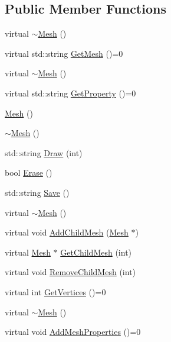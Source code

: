 \subsection*{Public Member Functions}
\begin{DoxyCompactItemize}
\item 
virtual \mbox{\hyperlink{class_mesh_a5efe4da1a4c0971cfb037bd70304c303}{$\sim$\+Mesh}} ()
\item 
virtual std\+::string \mbox{\hyperlink{class_mesh_ac9a0bc76a4e34c3985cbc4c20692c7df}{Get\+Mesh}} ()=0
\item 
virtual \mbox{\hyperlink{class_mesh_ad6a041191ed55c693254e945ce2869ff}{$\sim$\+Mesh}} ()
\item 
virtual std\+::string \mbox{\hyperlink{class_mesh_a94464260c2d9ad3c274f72b472fc9a2f}{Get\+Property}} ()=0
\item 
\mbox{\hyperlink{class_mesh_a2af137f1571af89172b9c102302c416b}{Mesh}} ()
\item 
\mbox{\hyperlink{class_mesh_a5efe4da1a4c0971cfb037bd70304c303}{$\sim$\+Mesh}} ()
\item 
std\+::string \mbox{\hyperlink{class_mesh_a4c2c032325385def999caf43e2ef88fd}{Draw}} (int)
\item 
bool \mbox{\hyperlink{class_mesh_a865729c3f6d111f09a7c422f102038ae}{Erase}} ()
\item 
std\+::string \mbox{\hyperlink{class_mesh_a2d249389fd92b8f6a2d66ac0ab644d6c}{Save}} ()
\item 
virtual \mbox{\hyperlink{class_mesh_ad6a041191ed55c693254e945ce2869ff}{$\sim$\+Mesh}} ()
\item 
virtual void \mbox{\hyperlink{class_mesh_a3f1bcf55b3058829dc7f3dcf260cd231}{Add\+Child\+Mesh}} (\mbox{\hyperlink{class_mesh}{Mesh}} $\ast$)
\item 
virtual \mbox{\hyperlink{class_mesh}{Mesh}} $\ast$ \mbox{\hyperlink{class_mesh_a6a97fe50af0e6b5bca76a15f73bbc1c0}{Get\+Child\+Mesh}} (int)
\item 
virtual void \mbox{\hyperlink{class_mesh_a530e7b4ea82226f6e15b0ff6c36ea3d8}{Remove\+Child\+Mesh}} (int)
\item 
virtual int \mbox{\hyperlink{class_mesh_ad8480168123d9a70563b00cdbe7e73ed}{Get\+Vertices}} ()=0
\item 
virtual \mbox{\hyperlink{class_mesh_ad6a041191ed55c693254e945ce2869ff}{$\sim$\+Mesh}} ()
\item 
virtual void \mbox{\hyperlink{class_mesh_a4369b541f608d9a812da80f4d7b13661}{Add\+Mesh\+Properties}} ()=0
\item 

\end{DoxyCompactItemize}
